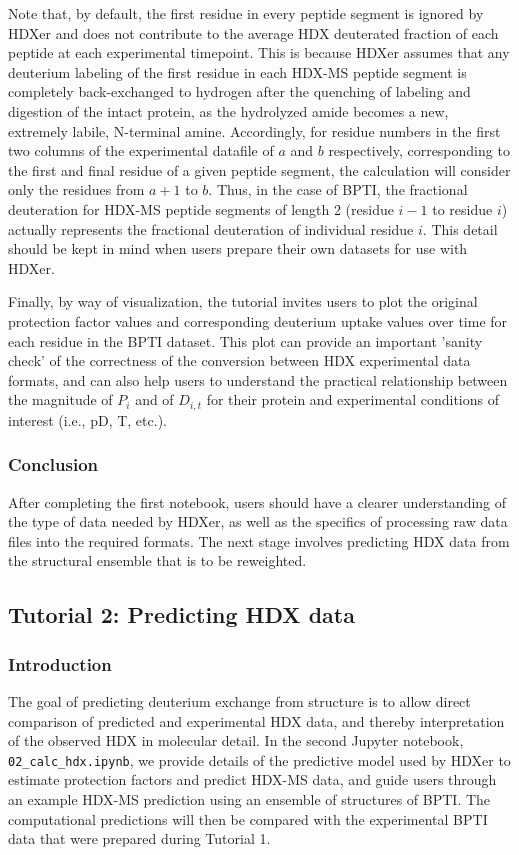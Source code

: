 \documentclass[9pt,tutorial]{livecoms}
\begin{document}
Note that, by default, the first residue in every peptide segment is ignored by HDXer and does not contribute to the average HDX deuterated fraction of each peptide at each experimental timepoint.
This is because HDXer assumes that any deuterium labeling of the first residue in each HDX-MS peptide segment is completely back-exchanged to hydrogen after the quenching of labeling and digestion of the intact protein, as the hydrolyzed amide becomes a new, extremely labile, N-terminal amine.
Accordingly, for residue numbers in the first two columns of the experimental datafile of $a$ and $b$ respectively, corresponding to the first and final residue of a given peptide segment, the calculation will consider only the residues from $a+1$ to $b$.
Thus, in the case of BPTI, the fractional deuteration for HDX-MS peptide segments of length 2 (residue $i-1$ to residue $i$) actually represents the fractional deuteration of individual residue $i$.
This detail should be kept in mind when users prepare their own datasets for use with HDXer.

Finally, by way of visualization, the tutorial invites users to plot the original protection factor values and corresponding deuterium uptake values over time for each residue in the BPTI dataset.
This plot can provide an important 'sanity check' of the correctness of the conversion between HDX experimental data formats, and can also help users to understand the practical relationship between the magnitude of $P_i$ and of $D_{i,t}$ for their protein and experimental conditions of interest (i.e., pD, T, etc.).

\subsubsection{Conclusion}
After completing the first notebook, users should have a clearer understanding of the type of data needed by HDXer, as well as the specifics of processing raw data files into the required formats. 
The next stage involves predicting HDX data from the structural ensemble that is to be reweighted.

\subsection{Tutorial 2: Predicting HDX data}\label{tutorial_2}

\subsubsection{Introduction}
The goal of predicting deuterium exchange from structure is to allow direct comparison of predicted and experimental HDX data, and thereby interpretation of the observed HDX in molecular detail.
In the second Jupyter notebook, \texttt{02\_calc\_hdx.ipynb}, we provide details of the predictive model used by HDXer to estimate protection factors and predict HDX-MS data, and guide users through an example HDX-MS prediction using an ensemble of structures of BPTI.
The computational predictions will then be compared with the experimental BPTI data that were prepared during Tutorial 1.
\end{document}
